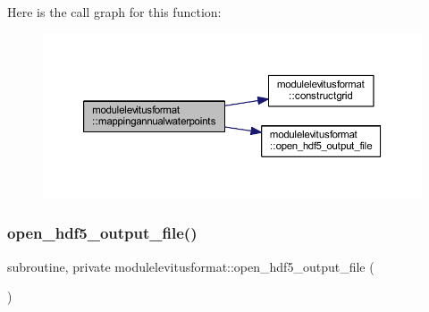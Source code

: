 Here is the call graph for this function\+:\nopagebreak
\begin{figure}[H]
\begin{center}
\leavevmode
\includegraphics[width=350pt]{namespacemodulelevitusformat_aeaf32cef0849c2f2d279062a6a41696a_cgraph}
\end{center}
\end{figure}
\mbox{\label{namespacemodulelevitusformat_a43a015e528279df64ee7b5856bb08147}} 
\subsubsection{\texorpdfstring{open\+\_\+hdf5\+\_\+output\+\_\+file()}{open\_hdf5\_output\_file()}}
{\footnotesize\ttfamily subroutine, private modulelevitusformat\+::open\+\_\+hdf5\+\_\+output\+\_\+file (\begin{DoxyParamCaption}{ }\end{DoxyParamCaption})\hspace{0.3cm}{\ttfamily [private]}}

